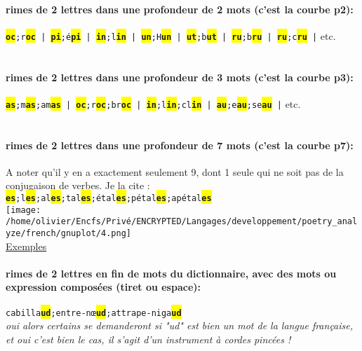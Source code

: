 \documentclass[french]{article}
\begin{document}
\paragraph{rimes de 2 lettres dans une profondeur de 2 mots (c'est la courbe p2):\\}
\texttt{\colorbox{yellow}{\textbf{oc}};r\colorbox{yellow}{\textbf{oc}} | \colorbox{yellow}{\textbf{pi}};é\colorbox{yellow}{\textbf{pi}} | \colorbox{yellow}{\textbf{in}};l\colorbox{yellow}{\textbf{in}} | \colorbox{yellow}{\textbf{un}};H\colorbox{yellow}{\textbf{un}} | \colorbox{yellow}{\textbf{ut}};b\colorbox{yellow}{\textbf{ut}} | \colorbox{yellow}{\textbf{ru}};b\colorbox{yellow}{\textbf{ru}} | \colorbox{yellow}{\textbf{ru}};c\colorbox{yellow}{\textbf{ru}} |} etc.\\
\\
\paragraph{rimes de 2 lettres dans une profondeur de 3 mots (c'est la courbe p3):\\}
\texttt{\colorbox{yellow}{\textbf{as}};m\colorbox{yellow}{\textbf{as}};am\colorbox{yellow}{\textbf{as}} | \colorbox{yellow}{\textbf{oc}};r\colorbox{yellow}{\textbf{oc}};br\colorbox{yellow}{\textbf{oc}} | \colorbox{yellow}{\textbf{in}};l\colorbox{yellow}{\textbf{in}};cl\colorbox{yellow}{\textbf{in}} | \colorbox{yellow}{\textbf{au}};e\colorbox{yellow}{\textbf{au}};se\colorbox{yellow}{\textbf{au}} |} etc.\\
\\
\paragraph{rimes de 2 lettres dans une profondeur de 7 mots (c'est la courbe p7):\\}
A noter qu'il y en a exactement seulement 9, dont 1 seule qui ne soit pas de la conjugaison de verbes. Je la cite :\\
\texttt{\colorbox{yellow}{\textbf{es}};l\colorbox{yellow}{\textbf{es}};al\colorbox{yellow}{\textbf{es}};tal\colorbox{yellow}{\textbf{es}};étal\colorbox{yellow}{\textbf{es}};pétal\colorbox{yellow}{\textbf{es}};apétal\colorbox{yellow}{\textbf{es}}}\\
\newpage
\texttt{[image: /home/olivier/Encfs/Privé/ENCRYPTED/Langages/developpement/poetry\_analyze/french/gnuplot/4.png]}\\
\underline{Exemples}\\
\paragraph{rimes de 2 lettres en fin de mots du dictionnaire, avec des mots ou expression composées (tiret ou espace):\\}
\texttt{cabilla\colorbox{yellow}{\textbf{ud}};entre-nœ\colorbox{yellow}{\textbf{ud}};attrape-niga\colorbox{yellow}{\textbf{ud}}}\\
\textit{oui alors certains se demanderont si "ud" est bien un mot de la langue française, et oui c'est bien le cas, il s'agit d'un instrument à cordes pincées !}\\
\end{document}
